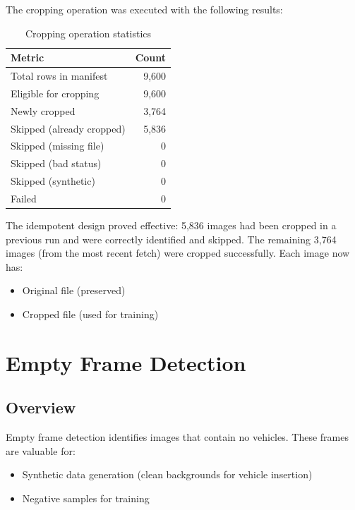 \documentclass[12pt,a4paper]{article}
\begin{document}
The cropping operation was executed with the following results:

\begin{table}[H]
\centering
\begin{tabular}{lr}
\toprule
\textbf{Metric} & \textbf{Count} \\
\midrule
Total rows in manifest & 9,600 \\
Eligible for cropping & 9,600 \\
Newly cropped & 3,764 \\
Skipped (already cropped) & 5,836 \\
Skipped (missing file) & 0 \\
Skipped (bad status) & 0 \\
Skipped (synthetic) & 0 \\
Failed & 0 \\
\bottomrule
\end{tabular}
\caption{Cropping operation statistics}
\end{table}

The idempotent design proved effective: 5,836 images had been cropped in a previous run and were correctly identified and skipped. The remaining 3,764 images (from the most recent fetch) were cropped successfully. Each image now has:
\begin{itemize}
	\item Original file (preserved)
	\item Cropped file (used for training)
\end{itemize}

\section{Empty Frame Detection}

\subsection{Overview}

Empty frame detection identifies images that contain no vehicles. These frames are valuable for:
\begin{itemize}
	\item Synthetic data generation (clean backgrounds for vehicle insertion)
	\item Negative samples for training
\end{itemize}
\end{document}
